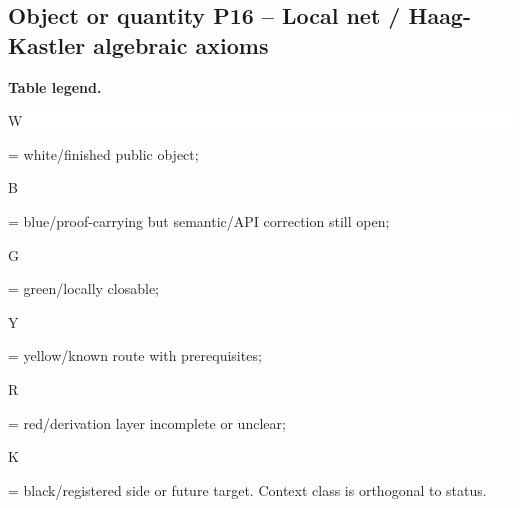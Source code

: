 \subsection*{Object or quantity P16 -- Local net /\allowbreak{} Haag-Kastler algebraic axioms}
\hypertarget{objproof:P16}{}
\par\smallskip\noindent\begin{minipage}{0.99\linewidth}\footnotesize\raggedright\textbf{Table legend.} \colorbox{white}{\strut W} = white/finished public object; \colorbox{cyan!20}{\strut B} = blue/proof-carrying but semantic/API correction still open; \colorbox{green!18}{\strut G} = green/locally closable; \colorbox{yellow!25}{\strut Y} = yellow/known route with prerequisites; \colorbox{red!20}{\strut R} = red/derivation layer incomplete or unclear; \colorbox{black!18}{\strut K} = black/registered side or future target. Context class is orthogonal to status.\end{minipage}\par\vspace{0.25em}
